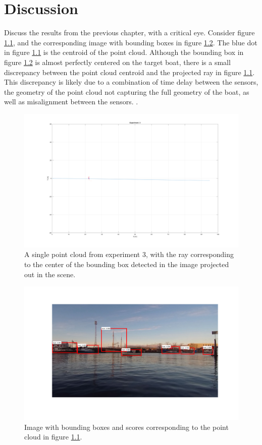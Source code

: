 
\chapter{Discussion}
Discuss the results from the previous chapter, with a critical eye.
Consider figure \ref{fig:example_ex3_pc}, and the corresponding image with bounding boxes in figure \ref{fig:example_ex3_im}. The blue dot in figure \ref{fig:example_ex3_pc} is the centroid of the point cloud. Although the bounding box in figure \ref{fig:example_ex3_im} is almost perfectly centered on the target boat, there is a small discrepancy between the point cloud centroid and the projected ray in figure \ref{fig:example_ex3_pc}. This discrepancy is likely due to a combination of time delay between the sensors, the geometry of the point cloud not capturing the full geometry of the boat, as well as misalignment between the sensors. .
\begin{figure}[H]
	\centering
	\includegraphics[width=\linewidth]{fig/example_1_pc.png}
	\caption{A single point cloud from experiment 3, with the ray corresponding to the center of the bounding box detected in the image projected out in the scene.}
	\label{fig:example_ex3_pc}
\end{figure}
\begin{figure}[H]
	\centering
	\includegraphics[width=\linewidth]{fig/example_1.png}
	\caption{Image with bounding boxes and scores corresponding to the point cloud in figure \ref{fig:example_ex3_pc}.}
	\label{fig:example_ex3_im}
\end{figure}
